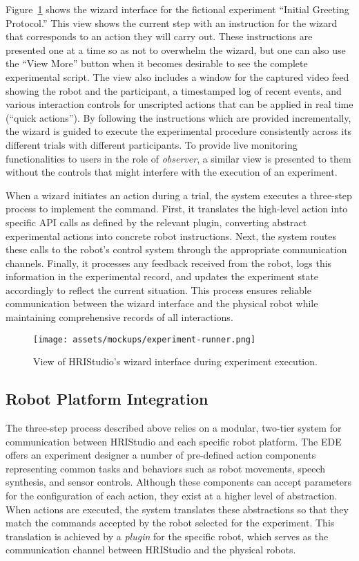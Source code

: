\documentclass[letterpaper, 10 pt, conference]{subfiles/ieeeconf}
\begin{document}
Figure~\ref{fig:experiment-runner} shows the wizard interface for the fictional experiment ``Initial Greeting Protocol.'' This view shows the current step with an instruction for the wizard that corresponds to an action they will carry out. These instructions are presented one at a time so as not to overwhelm the wizard, but one can also use the ``View More'' button when it becomes desirable to see the complete experimental script. The view also includes a window for the captured video feed showing the robot and the participant, a timestamped log of recent events, and various interaction controls for unscripted actions that can be applied in real time (``quick actions''). By following the instructions which are provided incrementally, the wizard is guided to execute the experimental procedure consistently across its different trials with different participants. To provide live monitoring functionalities to users in the role of \emph{observer}, a similar view is presented to them without the controls that might interfere with the execution of an experiment.

When a wizard initiates an action during a trial, the system executes a three-step process to implement the command. First, it translates the high-level action into specific API calls as defined by the relevant plugin, converting abstract experimental actions into concrete robot instructions. Next, the system routes these calls to the robot's control system through the appropriate communication channels. Finally, it processes any feedback received from the robot, logs this information in the experimental record, and updates the experiment state accordingly to reflect the current situation. This process ensures reliable communication between the wizard interface and the physical robot while maintaining comprehensive records of all interactions.

\begin{figure}[ht]
    \centering
\texttt{[image: assets/mockups/experiment-runner.png]}
\caption{View of HRIStudio's wizard interface during experiment execution.}
\label{fig:experiment-runner}
\end{figure}

\subsection{Robot Platform Integration}
\label{plugin-store}

The three-step process described above relies on a modular, two-tier system for communication between HRIStudio and each specific robot platform. The EDE offers an experiment designer a number of pre-defined action components representing common tasks and behaviors such as robot movements, speech synthesis, and sensor controls. Although these components can accept parameters for the configuration of each action, they exist at a higher level of abstraction. When actions are executed, the system translates these abstractions so that they match the  commands accepted by the robot selected for the experiment. This translation is achieved by a \emph{plugin} for the specific robot, which serves as the communication channel between HRIStudio and the physical robots. 
\end{document}
